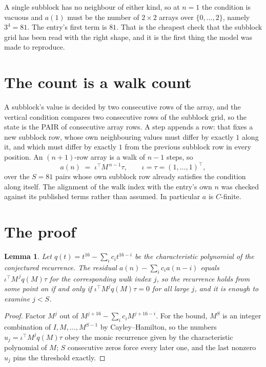 \documentclass[11pt,a4paper]{article}
\theoremstyle{plain}
\newtheorem{lemma}[theorem]{Lemma}
\theoremstyle{definition}
\begin{document}
A single subblock has no neighbour of either kind, so at $n=1$ the condition is vacuous and
$a(1)$ must be the number of $2\times2$ arrays over $\{0,\dots,2\}$, namely
$3^{4}=81$. The entry's first term is $81$.
That is the cheapest check that the subblock grid has been read with the right shape, and it
is the first thing the model was made to reproduce.

\section{The count is a walk count}

A subblock's value is decided by two consecutive rows of the array, and the
vertical condition compares two consecutive rows of the subblock grid, so the state is the
PAIR of consecutive array rows. A step appends a row: that fixes a new subblock row, whose own
neighbouring values must differ by exactly $1$ along it, and which must differ by exactly
$1$ from the previous subblock row in every position. An $(n+1)$-row array is a walk of
$n-1$ steps, so
\[
a(n)\;=\;\iota^{\!\top}M^{\,n-1}\tau,\qquad\iota=\tau=(1,\dots,1)^{\!\top},
\]
over the $S=81$ pairs whose own subblock row already satisfies the condition along itself.
The alignment of the walk index with the entry's own $n$ was checked against its published
terms rather than assumed. In particular $a$ is $C$-finite.

\section{The proof}

\begin{lemma}\label{lem:crit}
Let $q(t)=t^{16}-\sum_i c_it^{16-i}$ be the characteristic polynomial of the
conjectured recurrence. The residual $a(n)-\sum_ic_ia(n-i)$ equals
$\iota^{\!\top}M^{\,j}q(M)\tau$ for the corresponding walk index $j$, so the recurrence
holds from some point on if and only if $\iota^{\!\top}M^{j}q(M)\tau=0$ for all large $j$,
and it is enough to examine $j<S$.
\end{lemma}

\begin{proof}
Factor $M^{j}$ out of $M^{j+16}-\sum_ic_iM^{j+16-i}$. For the bound, $M^{S}$
is an integer combination of $I,M,\dots,M^{S-1}$ by Cayley--Hamilton, so the numbers
$u_j=\iota^{\!\top}M^{j}q(M)\tau$ obey the monic recurrence given by the characteristic
polynomial of $M$; $S$ consecutive zeros force every later one, and the last nonzero $u_j$
pins the threshold exactly.
\end{proof}
\end{document}
